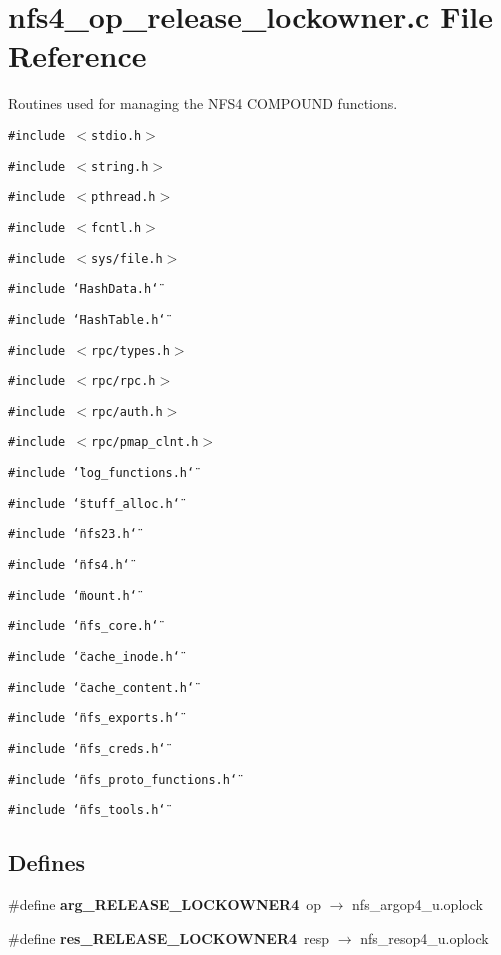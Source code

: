 \section{nfs4\_\-op\_\-release\_\-lockowner.c File Reference}
\label{nfs4__op__release__lockowner_8c}
Routines used for managing the NFS4 COMPOUND functions. 

{\tt \#include $<$stdio.h$>$}\par
{\tt \#include $<$string.h$>$}\par
{\tt \#include $<$pthread.h$>$}\par
{\tt \#include $<$fcntl.h$>$}\par
{\tt \#include $<$sys/file.h$>$}\par
{\tt \#include \char`\"{}Hash\-Data.h\char`\"{}}\par
{\tt \#include \char`\"{}Hash\-Table.h\char`\"{}}\par
{\tt \#include $<$rpc/types.h$>$}\par
{\tt \#include $<$rpc/rpc.h$>$}\par
{\tt \#include $<$rpc/auth.h$>$}\par
{\tt \#include $<$rpc/pmap\_\-clnt.h$>$}\par
{\tt \#include \char`\"{}log\_\-functions.h\char`\"{}}\par
{\tt \#include \char`\"{}stuff\_\-alloc.h\char`\"{}}\par
{\tt \#include \char`\"{}nfs23.h\char`\"{}}\par
{\tt \#include \char`\"{}nfs4.h\char`\"{}}\par
{\tt \#include \char`\"{}mount.h\char`\"{}}\par
{\tt \#include \char`\"{}nfs\_\-core.h\char`\"{}}\par
{\tt \#include \char`\"{}cache\_\-inode.h\char`\"{}}\par
{\tt \#include \char`\"{}cache\_\-content.h\char`\"{}}\par
{\tt \#include \char`\"{}nfs\_\-exports.h\char`\"{}}\par
{\tt \#include \char`\"{}nfs\_\-creds.h\char`\"{}}\par
{\tt \#include \char`\"{}nfs\_\-proto\_\-functions.h\char`\"{}}\par
{\tt \#include \char`\"{}nfs\_\-tools.h\char`\"{}}\par
\subsection*{Defines}
\begin{CompactItemize}
\item 
\#define {\bf arg\_\-RELEASE\_\-LOCKOWNER4}\ op $\rightarrow$ nfs\_\-argop4\_\-u.oplock
\item 
\#define {\bf res\_\-RELEASE\_\-LOCKOWNER4}\ resp $\rightarrow$ nfs\_\-resop4\_\-u.oplock
\end{CompactItemize}

